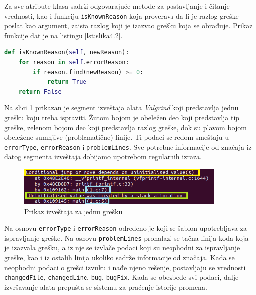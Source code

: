 \documentclass[12pt,oneside]{memoir}
\theoremstyle{plain}
\theoremstyle{definition}
\begin{document}
Za sve atribute klasa sadrži odgovarajuće metode za postavljanje i čitanje vrednosti, kao i funkciju  \texttt{isKnownReason} koja proverava da li je razlog greške poslat kao argument, zaista razlog koji je izazvao grešku koja se obrađuje. Prikaz funkcije dat je na listingu \ref{lst:slika4.2}.

\begin{lstlisting}[style=mystyle,caption={Prikaz funkcije koja proverava validnost razloga greške}, label={lst:slika4.2},language={Python}] 
def isKnownReason(self, newReason):
	for reason in self.errorReason:
		if reason.find(newReason) >= 0:
			return True
	return False
\end{lstlisting}


Na slici \ref{fig:slika4.3} prikazan je segment izveštaja alata \textit{Valgrind} koji predstavlja jednu grešku koju treba ispraviti. Žutom bojom je obeležen deo koji predstavlja tip greške, zelenom bojom deo koji predstavlja razlog greške, dok su plavom bojom obeležene sumnjive (problematične) linije. Ti podaci se redom smeštaju u \texttt{errorType}, \texttt{errorReason} i \texttt{problemLines}. Sve potrebne informacije od značaja iz datog segmenta izveštaja dobijamo upotrebom regularnih izraza.

\begin{figure}[!ht]
  \centering
  \includegraphics[width=0.9\textwidth]{ErrorClassExplaination.png}
  \caption{Prikaz izveštaja za jednu grešku}
  \label{fig:slika4.3}
\end{figure}

Na osnovu \texttt{errorType} i \texttt{errorReason} određeno je koji se šablon upotrebljava za ispravljanje greške. Na osnovu \texttt{problemLines} pronalazi se tačna linija koda koja je izazvala grešku, a iz nje se izvlače podaci koji su neophodni za ispravljanje greške, kao i iz ostalih linija ukoliko sadrže informacije od značaja. Kada se neophodni podaci o grešci izvuku i nađe njeno rešenje, postavljaju se vrednosti \texttt{changedFile}, \texttt{changedLine}, \texttt{bug}, \texttt{bugFix}. Kada se obezbede svi podaci, dalje izvršavanje alata prepušta se sistemu za praćenje istorije promena.
\end{document}

